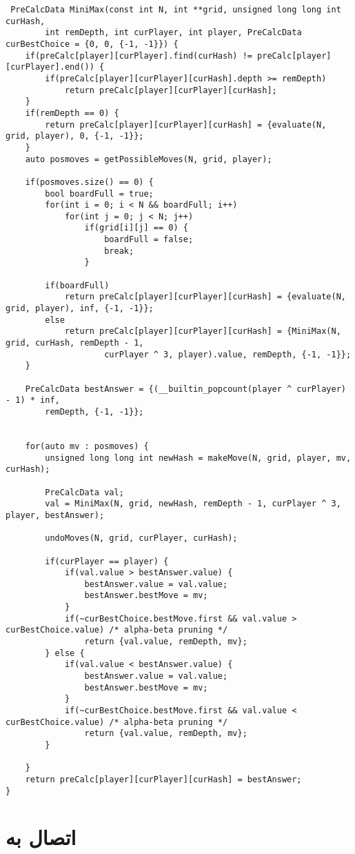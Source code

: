  \begin{latin}
 \begin{lstlisting}
 PreCalcData MiniMax(const int N, int **grid, unsigned long long int curHash, 
		int remDepth, int curPlayer, int player, PreCalcData curBestChoice = {0, 0, {-1, -1}}) {
	if(preCalc[player][curPlayer].find(curHash) != preCalc[player][curPlayer].end()) {
		if(preCalc[player][curPlayer][curHash].depth >= remDepth)
			return preCalc[player][curPlayer][curHash];
	}
	if(remDepth == 0) {
		return preCalc[player][curPlayer][curHash] = {evaluate(N, grid, player), 0, {-1, -1}};
	}
	auto posmoves = getPossibleMoves(N, grid, player);

	if(posmoves.size() == 0) {
		bool boardFull = true;
		for(int i = 0; i < N && boardFull; i++)
			for(int j = 0; j < N; j++)
				if(grid[i][j] == 0) {
					boardFull = false;
					break;
				}

		if(boardFull)
			return preCalc[player][curPlayer][curHash] = {evaluate(N, grid, player), inf, {-1, -1}};
		else
			return preCalc[player][curPlayer][curHash] = {MiniMax(N, grid, curHash, remDepth - 1, 
					curPlayer ^ 3, player).value, remDepth, {-1, -1}};
	}

	PreCalcData bestAnswer = {(__builtin_popcount(player ^ curPlayer) - 1) * inf, 
		remDepth, {-1, -1}};


	for(auto mv : posmoves) {
		unsigned long long int newHash = makeMove(N, grid, player, mv, curHash);

		PreCalcData val;
		val = MiniMax(N, grid, newHash, remDepth - 1, curPlayer ^ 3, player, bestAnswer);

		undoMoves(N, grid, curPlayer, curHash);

		if(curPlayer == player) {
			if(val.value > bestAnswer.value) {
				bestAnswer.value = val.value;
				bestAnswer.bestMove = mv;
			}
			if(~curBestChoice.bestMove.first && val.value > curBestChoice.value) /* alpha-beta pruning */
				return {val.value, remDepth, mv};
		} else {
			if(val.value < bestAnswer.value) {
				bestAnswer.value = val.value;
				bestAnswer.bestMove = mv;
			}
			if(~curBestChoice.bestMove.first && val.value < curBestChoice.value) /* alpha-beta pruning */
				return {val.value, remDepth, mv};
		}

	}
	return preCalc[player][curPlayer][curHash] = bestAnswer;
}

 \end{lstlisting}
 \end{latin}
 
 \section{اتصال به }
 
